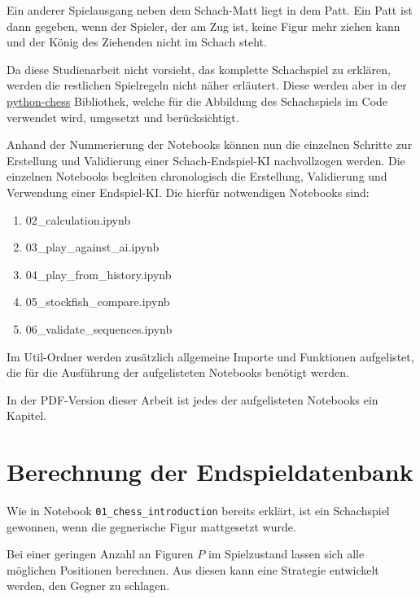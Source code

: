 \documentclass[12pt]{article}
\providecommand{\tightlist}{%
      \setlength{\itemsep}{0pt}\setlength{\parskip}{0pt}}
\begin{document}
Ein anderer Spielausgang neben dem Schach-Matt liegt in dem Patt. Ein
Patt ist dann gegeben, wenn der Spieler, der am Zug ist, keine Figur
mehr ziehen kann und der König des Ziehenden nicht im Schach steht.

    Da diese Studienarbeit nicht vorsieht, das komplette Schachspiel zu
erklären, werden die restlichen Spielregeln nicht näher erläutert. Diese
werden aber in der
\href{https://python-chess.readthedocs.io/en/latest/}{python-chess}
Bibliothek, welche für die Abbildung des Schachspiels im Code verwendet
wird, umgesetzt und berücksichtigt.

    Anhand der Nummerierung der Notebooks können nun die einzelnen Schritte
zur Erstellung und Validierung einer Schach-Endspiel-KI nachvollzogen
werden. Die einzelnen Notebooks begleiten chronologisch die Erstellung,
Validierung und Verwendung einer Endspiel-KI. Die hierfür notwendigen
Notebooks sind:

\begin{enumerate}
\def\labelenumi{\arabic{enumi}.}
\tightlist
\item
  02\_calculation.ipynb
\item
  03\_play\_against\_ai.ipynb
\item
  04\_play\_from\_history.ipynb
\item
  05\_stockfish\_compare.ipynb
\item
  06\_validate\_sequences.ipynb
\end{enumerate}

Im Util-Ordner werden zusätzlich allgemeine Importe und Funktionen
aufgelistet, die für die Ausführung der aufgelisteten Notebooks benötigt
werden.

In der PDF-Version dieser Arbeit ist jedes der aufgelisteten Notebooks
ein Kapitel.

    \hypertarget{berechnung-der-endspieldatenbank}{%
\section{Berechnung der
Endspieldatenbank}\label{berechnung-der-endspieldatenbank}}

Wie in Notebook \texttt{01\_chess\_introduction} bereits erklärt, ist
ein Schachspiel gewonnen, wenn die gegnerische Figur mattgesetzt wurde.

Bei einer geringen Anzahl an Figuren \(P\) im Spielzustand lassen sich
alle möglichen Positionen berechnen. Aus diesen kann eine Strategie
entwickelt werden, den Gegner zu schlagen.
\end{document}
